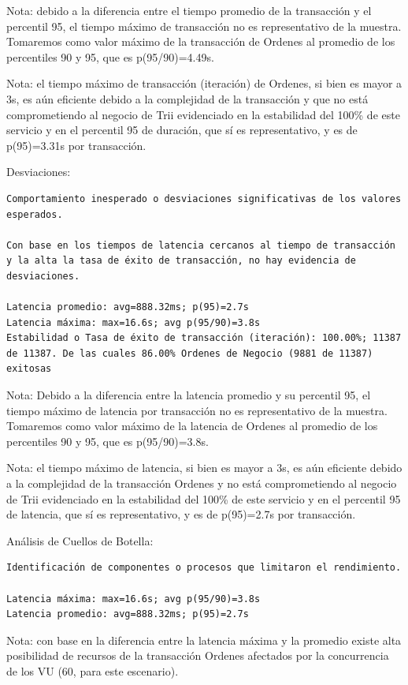 \documentclass[
  paper=a4,
  ,captions=tableheading
]{scrartcl}
\begin{document}
Nota: debido a la diferencia entre el tiempo promedio de la transacción
y el percentil 95, el tiempo máximo de transacción no es representativo
de la muestra. Tomaremos como valor máximo de la transacción de Ordenes
al promedio de los percentiles 90 y 95, que es p(95/90)=4.49s.

Nota: el tiempo máximo de transacción (iteración) de Ordenes, si bien es
mayor a 3s, es aún eficiente debido a la complejidad de la transacción y
que no está comprometiendo al negocio de Trii evidenciado en la
estabilidad del 100\% de este servicio y en el percentil 95 de duración,
que sí es representativo, y es de p(95)=3.31s por transacción.

Desviaciones:

\begin{verbatim}
Comportamiento inesperado o desviaciones significativas de los valores esperados.

Con base en los tiempos de latencia cercanos al tiempo de transacción y la alta la tasa de éxito de transacción, no hay evidencia de desviaciones.

Latencia promedio: avg=888.32ms; p(95)=2.7s
Latencia máxima: max=16.6s; avg p(95/90)=3.8s
Estabilidad o Tasa de éxito de transacción (iteración): 100.00%; 11387 de 11387. De las cuales 86.00% Ordenes de Negocio (9881 de 11387) exitosas
\end{verbatim}

Nota: Debido a la diferencia entre la latencia promedio y su percentil
95, el tiempo máximo de latencia por transacción no es representativo de
la muestra. Tomaremos como valor máximo de la latencia de Ordenes al
promedio de los percentiles 90 y 95, que es p(95/90)=3.8s.

Nota: el tiempo máximo de latencia, si bien es mayor a 3s, es aún
eficiente debido a la complejidad de la transacción Ordenes y no está
comprometiendo al negocio de Trii evidenciado en la estabilidad del
100\% de este servicio y en el percentil 95 de latencia, que sí es
representativo, y es de p(95)=2.7s por transacción.

Análisis de Cuellos de Botella:

\begin{verbatim}
Identificación de componentes o procesos que limitaron el rendimiento.

Latencia máxima: max=16.6s; avg p(95/90)=3.8s
Latencia promedio: avg=888.32ms; p(95)=2.7s
\end{verbatim}

Nota: con base en la diferencia entre la latencia máxima y la promedio
existe alta posibilidad de recursos de la transacción Ordenes afectados
por la concurrencia de los VU (60, para este escenario).
\end{document}
